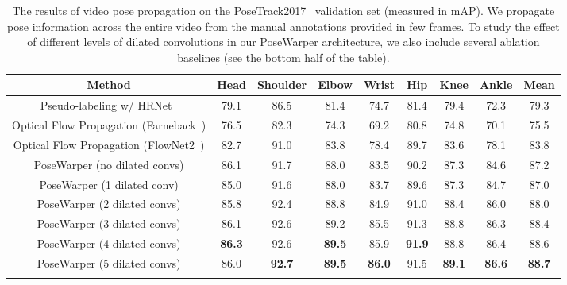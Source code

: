 \documentclass{article}
\begin{document}
\begin{table}[!t]
\caption{The results of video pose propagation on the PoseTrack2017~\cite{Iqbal_CVPR2017} validation set (measured in mAP). We propagate pose information across the entire video from the manual annotations provided in few frames. To study the effect of different levels of dilated convolutions in our PoseWarper architecture, we also include several ablation baselines (see the bottom half of the table).} \label{pose_propagation_table}
\setlength{\tabcolsep}{2.0pt}
\footnotesize
\begin{center}
 \begin{tabular}{c c  c  c  c  c  c  c | c } 
 \hline
 Method & Head & Shoulder & Elbow &  Wrist & Hip &  Knee & Ankle & Mean\\
 \hline Pseudo-labeling w/ HRNet~\cite{sun2019deep} & 79.1 & 86.5 & 81.4 & 74.7 & 81.4 & 79.4 & 72.3 &  79.3\\
Optical Flow Propagation (Farneback~\cite{Farneback:2003:TME:1763974.1764031}) & 76.5 & 82.3 & 74.3 & 69.2 & 80.8 & 74.8 & 70.1 & 75.5\\
  Optical Flow Propagation (FlowNet2~\cite{DBLP:journals/corr/IlgMSKDB16}) & 82.7 & 91.0 & 83.8 & 78.4 & 89.7 & 83.6 & 78.1 &  83.8\\ \hline
PoseWarper (no dilated convs) & 86.1 & 91.7 & 88.0 & 83.5 & 90.2 & 87.3 & 84.6 & 87.2\\
  PoseWarper (1 dilated conv) & 85.0 & 91.6 & 88.0 & 83.7 & 89.6 & 87.3 & 84.7 & 87.0\\
  PoseWarper (2 dilated convs) & 85.8 & 92.4 & 88.8 & 84.9 & 91.0 & 88.4 & 86.0 & 88.0\\
  PoseWarper (3 dilated convs) & 86.1 & 92.6 & 89.2 & 85.5 & 91.3 & 88.8 & 86.3 & 88.4\\
  PoseWarper (4 dilated convs) & \bf 86.3 & 92.6 & \bf 89.5 & 85.9 & \bf 91.9 & 88.8 & 86.4 & 88.6\\
  PoseWarper (5 dilated convs) & 86.0 & \bf 92.7 & \bf 89.5 & \bf 86.0 & 91.5 & \bf 89.1 & \bf 86.6 & \bf 88.7\\
\hline
  \vspace{-0.4cm}
\end{tabular}
\end{center}
\end{table}
\end{document}
